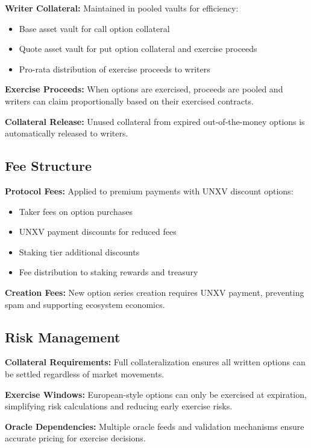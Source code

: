 \documentclass[12pt]{article}
\begin{document}
\textbf{Writer Collateral:} Maintained in pooled vaults for efficiency:
\begin{itemize}
    \item Base asset vault for call option collateral
    \item Quote asset vault for put option collateral and exercise proceeds
    \item Pro-rata distribution of exercise proceeds to writers
\end{itemize}

\textbf{Exercise Proceeds:} When options are exercised, proceeds are pooled and writers can claim proportionally based on their exercised contracts.

\textbf{Collateral Release:} Unused collateral from expired out-of-the-money options is automatically released to writers.

\subsection{Fee Structure}

\textbf{Protocol Fees:} Applied to premium payments with UNXV discount options:
\begin{itemize}
    \item Taker fees on option purchases
    \item UNXV payment discounts for reduced fees
    \item Staking tier additional discounts
    \item Fee distribution to staking rewards and treasury
\end{itemize}

\textbf{Creation Fees:} New option series creation requires UNXV payment, preventing spam and supporting ecosystem economics.

\subsection{Risk Management}

\textbf{Collateral Requirements:} Full collateralization ensures all written options can be settled regardless of market movements.

\textbf{Exercise Windows:} European-style options can only be exercised at expiration, simplifying risk calculations and reducing early exercise risks.

\textbf{Oracle Dependencies:} Multiple oracle feeds and validation mechanisms ensure accurate pricing for exercise decisions.
\end{document}
